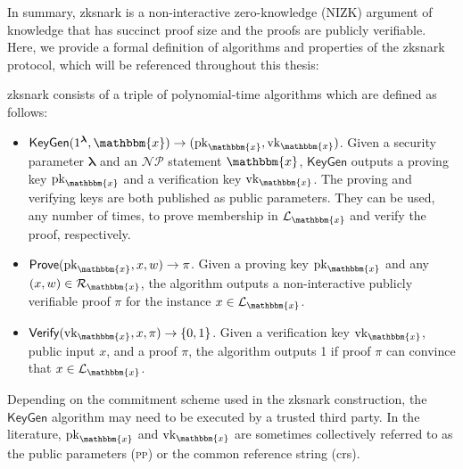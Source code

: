 In summary, \gls{zksnark} is a non-interactive zero-knowledge (NIZK) argument of knowledge that has succinct  proof size and the proofs are publicly verifiable. Here, we provide a formal definition of algorithms and properties of the \gls{zksnark} protocol, which will be referenced throughout this thesis:

\begin{definition}
	\label{def:Algorithms in a zkSNARK scheme}

	\gls{zksnark} consists of a triple of polynomial-time algorithms which are defined as follows: 
	\begin{itemize}
		\item $\mathsf{KeyGen}(1^{\boldsymbol{\lambda}}, \mathbbm{x}) \rightarrow (\text{pk}_\mathbbm{x}, \text{vk}_\mathbbm{x})$. Given a security parameter $\boldsymbol{\lambda}$ and an $\mathcal{NP}$ statement $\mathbbm{x}$, $\mathsf{KeyGen}$ outputs a proving key $\text{pk}_\mathbbm{x}$ and a verification key $\text{vk}_\mathbbm{x}$. The proving and verifying keys are both published as public parameters. They can be used, any number of times, to prove membership in $\mathcal{L}_\mathbbm{x}$ and verify the proof, respectively.
		
		\item $\mathsf{Prove}(\text{pk}_\mathbbm{x}, x, w) \rightarrow \pi$. Given a proving key $\text{pk}_\mathbbm{x}$ and any $(x, w) \in \mathcal{R}_\mathbbm{x}$, the algorithm outputs a non-interactive publicly verifiable proof $\pi$ for the instance $x\in \mathcal{L}_\mathbbm{x}$.
		
		\item $\mathsf{Verify}(\text{vk}_\mathbbm{x}, x, \pi) \rightarrow \{0, 1\}$. Given a verification key $\text{vk}_\mathbbm{x}$, public input $x$, and a proof $\pi$, the algorithm outputs 1 if proof $\pi$ can convince that $x\in \mathcal{L}_\mathbbm{x}$.
	\end{itemize}
\end{definition}

Depending on the commitment scheme used in the \gls{zksnark} construction, the $\mathsf{KeyGen}$ algorithm may need to be executed by a trusted third party. In the literature, $\text{pk}_\mathbbm{x}$ and $\text{vk}_\mathbbm{x}$ are sometimes collectively referred to as the public parameters (\textsc{pp}) or the common reference string (\gls{crs}).

